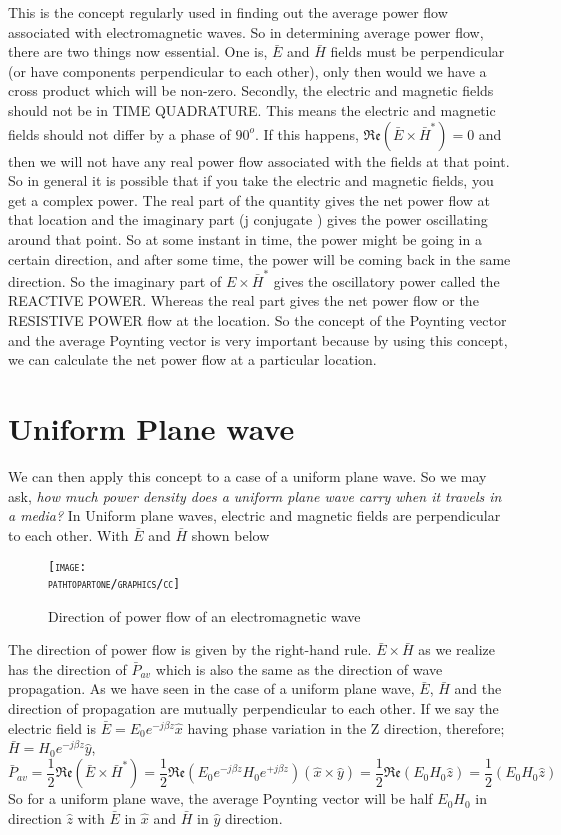 This is the concept regularly used in finding out the average power flow associated with electromagnetic waves. So in determining average power flow, there are two things now essential. One is, $ \bar{E} $ and $ \bar{H} $ fields must be perpendicular (or have components perpendicular to each other), only then would we have a cross product which will be non-zero. Secondly, the electric and magnetic fields should not be in TIME QUADRATURE. This means the electric and magnetic fields should not differ by a phase of $90^{o}$. If this happens, $ \mathfrak{Re}(\bar{E}\times\bar{H}^{*})=0 $ and then we will not have any real power flow associated with the fields at that point. So in general it is possible that if you take the electric and magnetic fields, you get a complex power. The real part of the quantity gives the net power flow at that location and the imaginary part (j conjugate ) gives the power oscillating around that point. So at some instant in time, the power might be going in a certain direction, and after some time, the power will be coming back in the same direction. So the imaginary part of $ E\times\bar{H}^{*} $ gives the oscillatory power called the REACTIVE POWER. Whereas the real part gives the net power flow or the RESISTIVE POWER flow at the location. So the concept of the Poynting vector and the average Poynting vector is very important because by using this concept, we can calculate the net power flow at a particular location.

\section{Uniform Plane wave}
We can then apply this concept to a case of a uniform plane wave. So we may ask, \emph{how much power density does a uniform plane wave carry when it travels in a media?} In Uniform plane waves, electric and magnetic fields are perpendicular to each other. With $ \bar{E} $ and $ \bar{H} $ shown below
\begin{figure}[h]
\centering
\textsc{\texttt{[image: \\pathtopartone/graphics/cc]}}
\caption{Direction of power flow of an electromagnetic wave}
\end{figure}

The direction of power flow is given by the right-hand rule. $ \bar{E}\times\bar{H} $ as we realize has the direction of $ \bar{P}_{av} $ which is also the same as the direction of wave propagation. As we have seen in the case of a uniform plane wave, $ \bar{E} $, $ \bar{H} $ and the direction of propagation are mutually perpendicular to each other. If we say the electric field is $ \bar{E}=E_0e^{-j\beta z}\hat{x} $ having phase variation in the Z direction, therefore;
$ \bar{H}=H_0e^{-j\beta z}\hat{y} $,
\begin{dmath*}
\bar{P}_{av}=\frac{1}{2}\mathfrak{Re}(\bar{E}\times\bar{H}^{*})
=\frac{1}{2}\mathfrak{Re}(E_0e^{-j\beta z}H_0e^{+j\beta z})(\hat{x}\times\hat{y})
=\frac{1}{2}\mathfrak{Re}(E_0H_0\hat{z})=\frac{1}{2}(E_0H_0\hat{z}) 
\end{dmath*}
So for a uniform plane wave, the average Poynting vector will be half $ E_0H_0 $ in direction $ \hat{z} $ with $ \bar{E} $ in $ \hat{x} $ and $ \bar{H} $ in $ \hat{y} $ direction.


